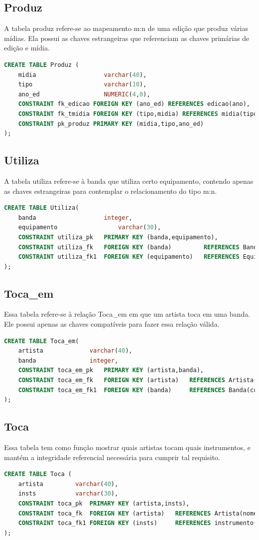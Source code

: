 \documentclass[12pt]{article}
\begin{document}
\subsection{Produz}
A tabela produz refere-se ao mapeamento m:n de uma edição que produz várias mídias. Ela possui as chaves estrangeiras que referenciam as chaves primárias de edição e mídia.
\begin{lstlisting}[language=sql]
CREATE TABLE Produz (
	midia					varchar(40),
	tipo					varchar(10),
	ano_ed					NUMERIC(4,0),
	CONSTRAINT fk_edicao FOREIGN KEY (ano_ed) REFERENCES edicao(ano),
	CONSTRAINT fk_tmidia FOREIGN KEY (tipo,midia) REFERENCES midia(tipo,nome),
	CONSTRAINT pk_produz PRIMARY KEY (midia,tipo,ano_ed)
);
\end{lstlisting}

\subsection{Utiliza}
A tabela utiliza refere-se à banda que utiliza certo equipamento, contendo apenas as chaves estrangeiras para contemplar o relacionamento do tipo m:n.
\begin{lstlisting}[language=sql]
CREATE TABLE Utiliza(
	banda					integer,
	equipamento 				varchar(30),
	CONSTRAINT utiliza_pk 	PRIMARY KEY (banda,equipamento),
	CONSTRAINT utiliza_fk	FOREIGN KEY (banda) 		REFERENCES Banda(cod),
	CONSTRAINT utiliza_fk1	FOREIGN KEY (equipamento) 	REFERENCES Equipamento(n_serie)
);
\end{lstlisting}

\subsection{Toca\_em}
Essa tabela refere-se à relação Toca\_em em que um artista toca em uma banda. Ele possui apenas as chaves compatíveis para fazer essa relação válida.
\begin{lstlisting}[language=sql]
CREATE TABLE Toca_em(
	artista 			varchar(40),
	banda				integer,
	CONSTRAINT toca_em_pk 	PRIMARY KEY (artista,banda),
	CONSTRAINT toca_em_fk	FOREIGN KEY (artista) 	REFERENCES Artista(nome),
	CONSTRAINT toca_em_fk1	FOREIGN KEY (banda) 	REFERENCES Banda(cod)
);
\end{lstlisting}

\subsection{Toca}
Essa tabela tem como função mostrar quais artistas tocam quais instrumentos, e mantém a integridade referencial necessária para cumprir tal requisito.
\begin{lstlisting}[language=sql]
CREATE TABLE Toca (
	artista			varchar(40),
	insts 			varchar(30),
	CONSTRAINT toca_pk 	PRIMARY KEY (artista,insts),
	CONSTRAINT toca_fk	FOREIGN KEY (artista) 	REFERENCES Artista(nome),
	CONSTRAINT toca_fk1	FOREIGN KEY (insts) 	REFERENCES instrumento(n_serie)
);
\end{lstlisting}
\end{document}
